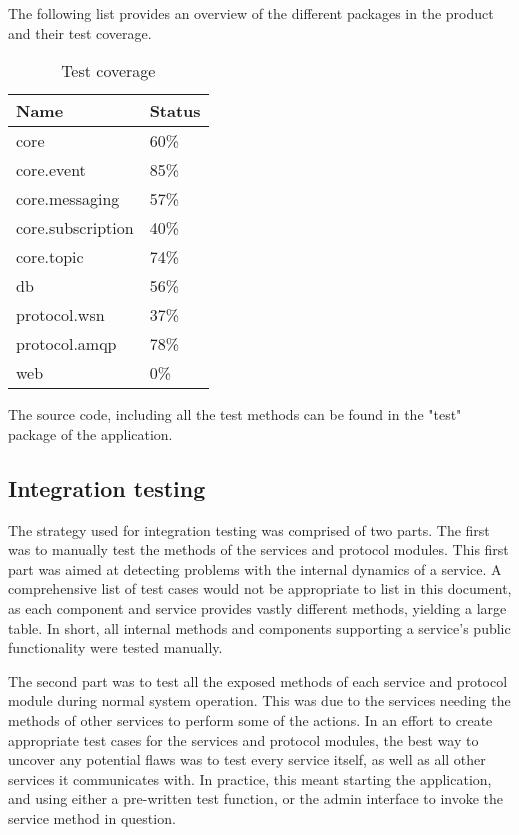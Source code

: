 The following list provides an overview of the different packages in the product and their test coverage.


\begin{center}
\begin{table}[ht!]
\small
\centering
\begin{tabular}{|p{5cm}|p{2cm}|}
\hline
\rowcolor{lightgray}
\textbf{Name} & \textbf{Status} \\
\hline
 core & 60\%  \\
 core.event & 85\% \\ 
 core.messaging & 57\% \\ 
 core.subscription & 40\% \\ 
 core.topic & 74\% \\
 db & 56\% \\
 protocol.wsn & 37\% \\
 protocol.amqp & 78\% \\
 web & 0\% \\
\hline
\end{tabular}
\caption{Test coverage}
\label{tab:test coverage}
\end{table}
\end{center}


The source code, including all the test methods can be found in the "test" package of the application.

\subsection{Integration testing}
\label{subsec:testing-test_execution-integration_testing}

The strategy used for integration testing was comprised of two parts. The first was to manually test the methods of the services and protocol modules. This first part was aimed at detecting problems with the internal dynamics of a service. A comprehensive list of test cases would not be appropriate to list in this document, as each component and service provides vastly different methods, yielding a large table. In short, all internal methods and components supporting a service's public functionality were tested manually.

The second part was to test all the exposed methods of each service and protocol module during normal system operation. This was due to the services needing the methods of other services to perform some of the actions. In an effort to create appropriate test cases for the services and protocol modules, the best way to uncover any potential flaws was to test every service itself, as well as all other services it communicates with. In practice, this meant starting the application, and using either a pre-written test function, or the admin interface to invoke the service method in question.

